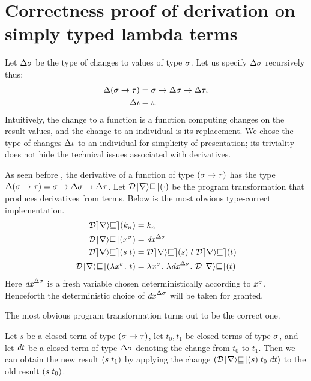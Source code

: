 \section{Correctness proof of derivation on simply typed lambda
  terms}
\label{sec:STLC-correct}

Let $\Delta\sigma$ be the type of changes to values of type $\sigma$. Let
us specify $\Delta\sigma$ recursively thus:
\begin{align*}
\Delta(\sigma\to\tau)&=\sigma \to \Delta\sigma \to \Delta\tau,\\
\Delta\iota&=\iota.
\end{align*}
Intuitively, the change to a function is a function computing
changes on the result values, and the change to an individual is
its replacement.
We chose the type of changes $\Delta\iota$ to an individual for
simplicity of presentation; its triviality does not hide the
technical issues associated with derivatives.

As seen before ,
the derivative of a function of type $(\sigma\to\tau)$ has the type
$\Delta(\sigma\to\tau)=\sigma\to\Delta\sigma\to\Delta\tau$.
Let $\Derive{\cdot}$ be the program transformation that produces
derivatives from terms. Below is the most obvious
 type-correct
implementation.
\begin{align*}
\Derive{\Lit{k_n}}     & = \Lit{k_n}\\
\Derive{\Var{x^\Gs}}   & = \Var{\D x^{\GD\Gs}}\\
\Derive{\App{s}{t}}    & = \App{\App{\Derive{s}}{t}}{\Derive{t}}\\
\Derive{\Lam{x^\Gs}{t}}& = \Lam{x^\Gs}{\Lam{\D x^{\GD\Gs}}{\Derive{t}}}
\end{align*}
Here $\mathit{dx}^{\Delta\sigma}$ is a fresh variable chosen deterministically
according to $x^{\sigma}$. Henceforth the deterministic choice of
$\mathit{dx}^{\Delta\sigma}$ will be taken for granted.

The most obvious program transformation turns out to be the
correct one.

\begin{theorem}
\label{thm:STLC-correct}
Let $s$ be a closed term of type $(\sigma\to\tau)$, let $t_0,t_1$ be
closed terms of type $\sigma$, and let $\mathit{dt}$ be a closed term of
type $\Delta\sigma$ denoting the change from $t_0$ to $t_1$. Then we
can obtain the new result $\App* s {t_1}$ by applying the change
$\App*{\App{\Derive s}{t_0}}{\D t}$ to the old result
$\App* s {t_0}$.
\end{theorem}

